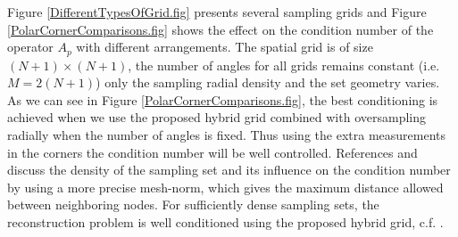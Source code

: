 \documentclass{UCF_ETD}
\begin{document}
 Figure \ref{DifferentTypesOfGrid.fig} presents several sampling grids and Figure \ref{PolarCornerComparisons.fig} shows the effect on the condition number of the operator $A_p$ with different arrangements. The spatial grid is of size $(N+1)\times (N+1)$, the number of angles for all grids remains constant (i.e. $M = 2(N+1)$) only the sampling radial density and the set geometry varies. As we can see in Figure \ref{PolarCornerComparisons.fig}, the best conditioning is achieved when we use the proposed hybrid grid combined with oversampling radially when the number of angles is fixed. Thus using the extra measurements in the corners the condition number will be well controlled. References \cite{Bass2005} and \cite{Markus2007} discuss the density of the sampling set and its influence on the condition number by using a more precise mesh-norm, which gives the maximum distance allowed between neighboring nodes. For sufficiently dense sampling sets, the reconstruction problem is well conditioned using the proposed hybrid grid, c.f. \cite{Markus2007}.
 
 
 
\end{document}
